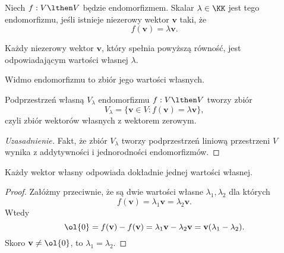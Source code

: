 \begin{definition}
    Niech $f : V \lthen V$ będzie endomorfizmem. Skalar $\lambda \in \KK$ jest  tego endomorfizmu, jeśli istnieje niezerowy wektor $\mathbf{v}$ taki, że
    \[ f(\mathbf{v}) = \lambda\mathbf{v}. \]

    Każdy niezerowy wektor $\mathbf{v}$, który spełnia powyższą równość, jest  odpowiadającym wartości własnej $\lambda$.
\end{definition}

\begin{definition}
    Widmo endomorfizmu to zbiór jego wartości własnych.
\end{definition}

\begin{definition}
    Podprzestrzeń własną $V_\lambda$ endomorfizmu $f : V \lthen V$ tworzy zbiór
    \[ V_\lambda = \{\mathbf{v} \in V : f(\mathbf{v}) = \lambda\mathbf{v}\}, \]
    czyli zbiór wektorów własnych z wektorem zerowym.
\end{definition}
\begin{proof}[Uzasadnienie]
    Fakt, że zbiór $V_\lambda$ tworzy podprzestrzeń liniową przestrzeni $V$ wynika z addytywności i jednorodności endomorfizmów.
\end{proof}

\begin{theorem}
    Każdy wektor własny odpowiada dokładnie jednej wartości własnej.
\end{theorem}
\begin{proof}
    Załóżmy przeciwnie, że są dwie wartości własne $\lambda_1, \lambda_2$ dla których
    \[ f(\mathbf{v}) = \lambda_1\mathbf{v} = \lambda_2\mathbf{v}. \]
    Wtedy
    \[ \ol{0} = f(\mathbf{v}) - f(\mathbf{v}) = \lambda_1\mathbf{v} - \lambda_2\mathbf{v} = \mathbf{v}(\lambda_1 - \lambda_2). \]
    Skoro $\mathbf{v} \neq \ol{0}$, to $\lambda_1 = \lambda_2$.
\end{proof}

